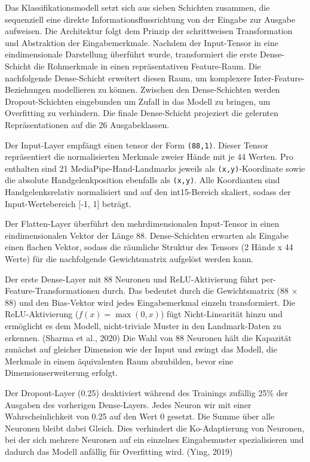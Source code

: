 Das Klassifikationsmodell setzt sich aus sieben Schichten zusammen, die sequenziell eine direkte Informationsflussrichtung von der Eingabe zur Ausgabe aufweisen. Die Architektur folgt dem Prinzip der schrittweisen Transformation und Abstraktion der Eingabemerkmale. Nachdem der Input-Tensor in eine eindimensionale Darstellung überführt wurde, transformiert die erste Dense-Schicht die Rohmerkmale in einen repräsentativen Feature-Raum. Die nachfolgende Dense-Schicht erweitert diesen Raum, um komplexere Inter-Feature-Beziehungen modellieren zu können. Zwischen den Dense-Schichten werden Dropout-Schichten eingebunden um Zufall in das Modell zu bringen, um Overfitting zu verhindern. Die finale Dense-Schicht projeziert die gelernten Repräsentationen auf die 26 Ausgabeklassen.

Der Input-Layer empfängt einen tensor der Form \texttt{(88,1)}. Dieser Tensor repräsentiert die normalisierten Merkmale zweier Hände mit je 44 Werten. Pro enthalten sind 21 MediaPipe-Hand-Landmarks jeweils als \texttt{(x,y)}-Koordinate sowie die absolute Handgelenkposition ebenfalls als \texttt{(x,y)}. Alle Koordianten sind Handgelenksrelativ normalisiert und auf den int15-Bereich skaliert, sodass der Input-Wertebereich [-1, 1] beträgt.

Der Flatten-Layer überführt den mehrdimensionalen Input-Tensor in einen eindimensionalen Vektor der Länge 88. Dense-Schichten erwarten als Eingabe einen flachen Vektor, sodass die räumliche Struktur des Tensors (2 Hände x 44 Werte) für die nachfolgende Gewichtsmatrix aufgelöst werden kann.

Der erste Dense-Layer mit 88 Neuronen und ReLU-Aktivierung führt per-Feature-Transformationen durch. Das bedeutet durch die  Gewichtsmatrix (88 × 88) und den Bias-Vektor wird jedes Eingabemerkmal einzeln transformiert. Die ReLU-Aktivierung ($f(x) = \max(0, x)$) fügt Nicht-Linearität hinzu und ermöglicht es dem Modell, nicht-triviale Muster in den Landmark-Daten zu erkennen. (Sharma et al., 2020) Die Wahl von 88 Neuronen hält die Kapazität zunächst auf gleicher Dimension wie der Input und zwingt das Modell, die Merkmale in einem äquivalenten Raum abzubilden, bevor eine Dimensionserweiterung erfolgt.

Der Dropout-Layer (0.25) deaktiviert während des Trainings zufällig 25\% der Ausgaben des vorherigen Dense-Layers. Jedes Neuron wir mit einer Wahrscheinlichkeit von 0.25 auf den Wert 0 gesetzt. Die Summe über alle Neuronen bleibt dabei Gleich. Dies verhindert die Ko-Adaptierung von Neuronen, bei der sich mehrere Neuronen auf ein einzelnes Eingabemuster spezialisieren und dadurch das Modell anfällig für Overfitting wird. (Ying, 2019)

